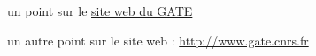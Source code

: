   \item un point sur le \href{http://www.gate.cnrs.fr}{site web du GATE}
  \item un autre point sur le site web : \url{http://www.gate.cnrs.fr}
